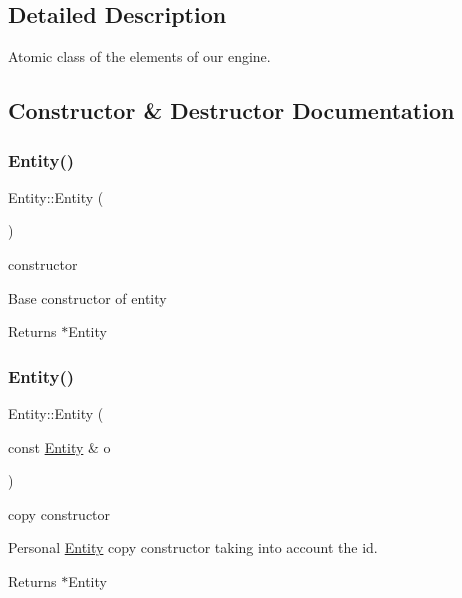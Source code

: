\subsection{Detailed Description}
Atomic class of the elements of our engine. 

\subsection{Constructor \& Destructor Documentation}
\mbox{\label{class_entity_a980f368aa07ce358583982821533a54a}} 
\subsubsection{\texorpdfstring{Entity()}{Entity()}\hspace{0.1cm}{\footnotesize\ttfamily [1/2]}}
{\footnotesize\ttfamily Entity\+::\+Entity (\begin{DoxyParamCaption}{ }\end{DoxyParamCaption})}

constructor

Base constructor of entity

\begin{DoxyReturn}{Returns}
$\ast$\+Entity 
\end{DoxyReturn}
\mbox{\label{class_entity_ad758dc48d715e48ada4193517f1d32ea}} 
\subsubsection{\texorpdfstring{Entity()}{Entity()}\hspace{0.1cm}{\footnotesize\ttfamily [2/2]}}
{\footnotesize\ttfamily Entity\+::\+Entity (\begin{DoxyParamCaption}\item[{const \hyperlink{class_entity}{Entity} \&}]{o }\end{DoxyParamCaption})}

copy constructor

Personal \hyperlink{class_entity}{Entity} copy constructor taking into account the id.

\begin{DoxyReturn}{Returns}
$\ast$\+Entity 
\end{DoxyReturn}


